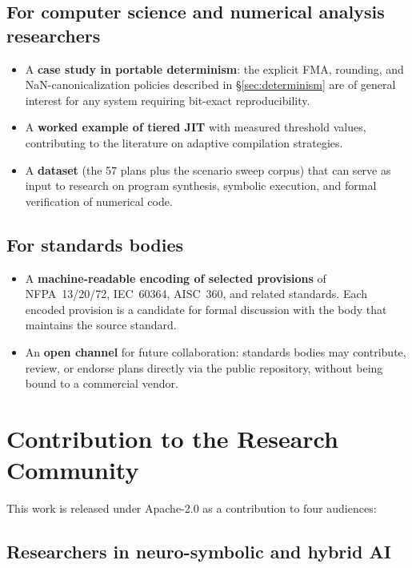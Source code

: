 \documentclass[11pt,a4paper]{article}
\begin{document}
\subsection{For computer science and numerical analysis researchers}

\begin{itemize}[leftmargin=*]
\item A \textbf{case study in portable determinism}: the explicit FMA, rounding, and NaN-canonicalization policies described in \S\ref{sec:determinism} are of general interest for any system requiring bit-exact reproducibility.
\item A \textbf{worked example of tiered JIT} with measured threshold values, contributing to the literature on adaptive compilation strategies.
\item A \textbf{dataset} (the 57 plans plus the scenario sweep corpus) that can serve as input to research on program synthesis, symbolic execution, and formal verification of numerical code.
\end{itemize}

\subsection{For standards bodies}

\begin{itemize}[leftmargin=*]
\item A \textbf{machine-readable encoding of selected provisions} of NFPA~13/20/72, IEC~60364, AISC~360, and related standards. Each encoded provision is a candidate for formal discussion with the body that maintains the source standard.
\item An \textbf{open channel} for future collaboration: standards bodies may contribute, review, or endorse plans directly via the public repository, without being bound to a commercial vendor.
\end{itemize}

\section{Contribution to the Research Community}
\label{sec:community}

This work is released under Apache-2.0 as a contribution to four audiences:

\subsection{Researchers in neuro-symbolic and hybrid AI}
\end{document}
